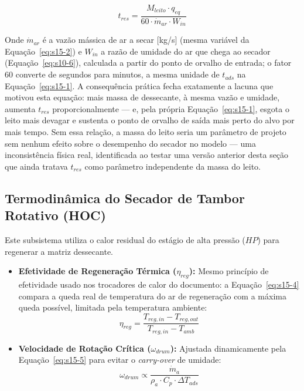 \documentclass[12pt,a4paper]{article}
\numberwithin{equation}{section}
\numberwithin{table}{section}
\numberwithin{figure}{section}
\begin{document}
{		\begin{equation}\label{eq:s15-14}
		t_{res} = \frac{M_{leito} \cdot q_{eq}}{60 \cdot \dot{m}_{ar} \cdot W_{in}}
		\end{equation}

		Onde $\dot{m}_{ar}$ é a vazão mássica de ar a secar [kg/s] (mesma variável da Equação~\eqref{eq:s15-2}) e $W_{in}$ a razão de umidade do ar que chega ao secador (Equação~\eqref{eq:s10-6}), calculada a partir do ponto de orvalho de entrada; o fator 60 converte de segundos para minutos, a mesma unidade de $t_{ads}$ na Equação~\eqref{eq:s15-1}. A consequência prática fecha exatamente a lacuna que motivou esta equação: mais massa de dessecante, à mesma vazão e umidade, aumenta $t_{res}$ proporcionalmente — e, pela própria Equação~\eqref{eq:s15-1}, esgota o leito mais devagar e sustenta o ponto de orvalho de saída mais perto do alvo por mais tempo. Sem essa relação, a massa do leito seria um parâmetro de projeto sem nenhum efeito sobre o desempenho do secador no modelo — uma inconsistência física real, identificada ao testar uma versão anterior desta seção que ainda tratava $t_{res}$ como parâmetro independente da massa do leito.

		\subsection{\textbf{Termodinâmica do Secador de Tambor Rotativo (HOC)}}
		
		Este subsistema utiliza o calor residual do estágio de alta pressão ($HP$) para regenerar a matriz dessecante.
		
		\begin{itemize}
			\item \textbf{Efetividade de Regeneração Térmica ($\eta_{reg}$):} Mesmo princípio de efetividade usado nos trocadores de calor do documento: a Equação~\eqref{eq:s15-4} compara a queda real de temperatura do ar de regeneração com a máxima queda possível, limitada pela temperatura ambiente:
			\begin{equation}\label{eq:s15-4}
\eta_{reg} = \frac{T_{reg,in} - T_{reg,out}}{T_{reg,in} - T_{amb}}
\end{equation}
			
			\item \textbf{Velocidade de Rotação Crítica ($\omega_{drum}$):}
			Ajustada dinamicamente pela Equação~\eqref{eq:s15-5} para evitar o \textit{carry-over} de umidade:
			\begin{equation}\label{eq:s15-5}
\omega_{drum} \propto \frac{\dot{m}_a}{\rho_a \cdot C_p \cdot \Delta T_{ads}}
\end{equation}
		\end{itemize}

}
\end{document}

